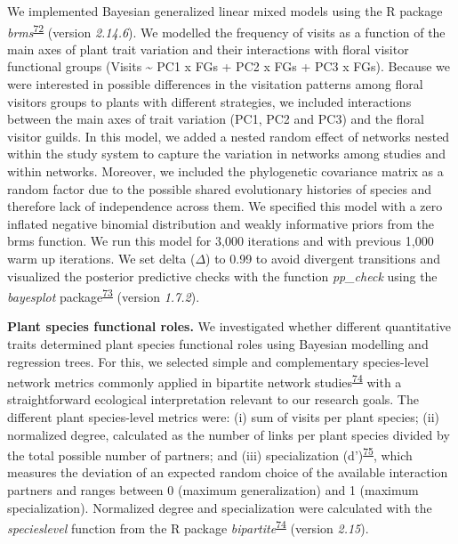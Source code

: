 \documentclass[
  12pt,
  a4paper,
]{article}
\begin{document}
We implemented Bayesian generalized linear mixed models using the R package \emph{brms}\textsuperscript{\protect\hyperlink{ref-burkner2017}{72}} (version \emph{2.14.6}). We modelled the frequency of visits as a function of the main axes of plant trait variation and their interactions with floral visitor functional groups (Visits \textasciitilde{} PC1 x FGs + PC2 x FGs + PC3 x FGs). Because we were interested in possible differences in the visitation patterns among floral visitors groups to plants with different strategies, we included interactions between the main axes of trait variation (PC1, PC2 and PC3) and the floral visitor guilds. In this model, we added a nested random effect of networks nested within the study system to capture the variation in networks among studies and within networks. Moreover, we included the phylogenetic covariance matrix as a random factor due to the possible shared evolutionary histories of species and therefore lack of independence across them. We specified this model with a zero inflated negative binomial distribution and weakly informative priors from the brms function. We run this model for 3,000 iterations and with previous 1,000 warm up iterations. We set delta (\(\Delta\)) to 0.99 to avoid divergent transitions and visualized the posterior predictive checks with the function \emph{pp\_check} using the \emph{bayesplot} package\textsuperscript{\protect\hyperlink{ref-gabry2019}{73}} (version \emph{1.7.2}).

\textbf{Plant species functional roles.} We investigated whether different quantitative traits determined plant species functional roles using Bayesian modelling and regression trees. For this, we selected simple and complementary species-level network metrics commonly applied in bipartite network studies\textsuperscript{\protect\hyperlink{ref-dormann2008}{74}} with a straightforward ecological interpretation relevant to our research goals. The different plant species-level metrics were: (i) sum of visits per plant species; (ii) normalized degree, calculated as the number of links per plant species divided by the total possible number of partners; and (iii) specialization (d')\textsuperscript{\protect\hyperlink{ref-bluthgen2006}{75}}, which measures the deviation of an expected random choice of the available interaction partners and ranges between 0 (maximum generalization) and 1 (maximum specialization). Normalized degree and specialization were calculated with the \emph{specieslevel} function from the R package \emph{bipartite}\textsuperscript{\protect\hyperlink{ref-dormann2008}{74}} (version \emph{2.15}).
\end{document}
